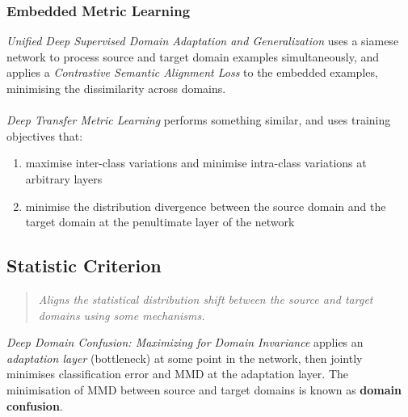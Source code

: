 \documentclass{report}
\newcommand{\quoteit}[1]{\begin{quote}\textit{#1}\end{quote}}
\begin{document}
\subsubsection{Embedded Metric Learning}
\textit{Unified Deep Supervised Domain Adaptation and Generalization}\parencite{unifieddeepadaptation} uses a siamese network to process source and target domain examples simultaneously, and applies a \textit{Contrastive Semantic Alignment Loss} to the embedded examples, minimising the dissimilarity across domains. \\ \\
\textit{Deep Transfer Metric Learning}\parencite{deeptransfermetric} performs something similar, and uses training objectives that:
\begin{enumerate}
	\item maximise inter-class variations and minimise intra-class variations at arbitrary layers
	\item minimise the distribution divergence between the source domain and the target domain at the penultimate layer of the network
\end{enumerate}






\subsection{Statistic Criterion}
\quoteit{Aligns the statistical distribution shift between the source and target domains using some mechanisms.}
\begin{center}
\end{center}

\textit{Deep Domain Confusion: Maximizing for Domain Invariance}\parencite{deepdomainconfusion} applies an \textit{adaptation layer} (bottleneck) at some point in the network, then jointly minimises classification error and MMD at the adaptation layer. The minimisation of MMD between source and target domains is known as \textbf{domain confusion}.
\end{document}
